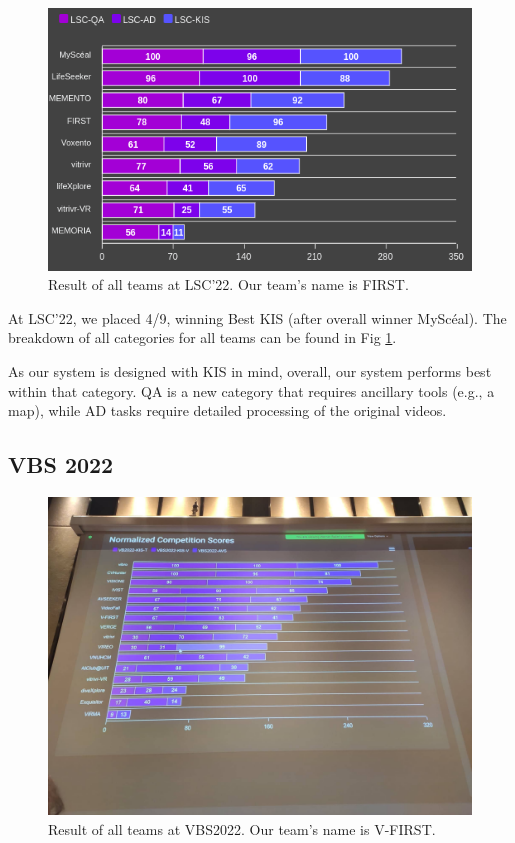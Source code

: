 \begin{figure}[h]
    \centering
    \includegraphics[width=\textwidth]{content/resources/images/evaluation/LSC2022_results.png}
    \caption{Result of all teams at LSC'22. Our team's name is FIRST.}
    \label{fig:LSC2022_results}
\end{figure}

At LSC'22, we placed 4/9, winning Best KIS (after overall winner MyScéal). The breakdown of all categories for all teams can be found in Fig \ref{fig:LSC2022_results}.

As our system is designed with KIS in mind, overall, our system performs best within that category. QA is a new category that requires ancillary tools (e.g., a map), while AD tasks require detailed processing of the original videos.

\subsection{VBS 2022}
\label{sec:VBS2022}

\begin{figure}[h]
    \centering
    \includegraphics[width=\textwidth]{content/resources/images/evaluation/VBS2022_results.jpg}
    \caption{Result of all teams at VBS2022. Our team's name is V-FIRST.}
    \label{fig:VBS2022_results}
\end{figure}

